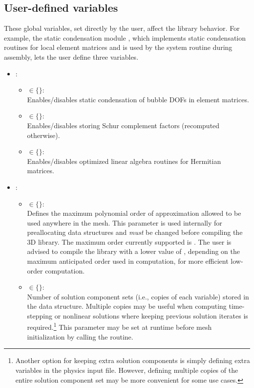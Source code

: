 \subsection{User-defined variables}

These global variables, set directly by the user, affect the library behavior. For example, the static condensation module , which implements static condensation routines for local element matrices and is used by the system routine  during assembly, lets the user define three variables.

\begin{itemize}
	\item
	{
		 :
		\begin{itemize}
			\item { $\in \{$$\}$: \\
				Enables/disables static condensation of bubble DOFs in element matrices.}
			\item { $\in \{$$\}$: \\
				Enables/disables storing Schur complement factors (recomputed otherwise).}
			\item { $\in \{$$\}$: \\
				Enables/disables optimized linear algebra routines for Hermitian matrices.}
		\end{itemize}
	}
	\item
	{
		 : 
		\begin{itemize}
			\item { $\in \{$$\}$:\\
			Defines the maximum polynomial order of approximation allowed to be used anywhere in the mesh. This parameter is used internally for preallocating data structures and \emph{must} be changed before compiling the \hp3D library. The maximum order currently supported is . The user is advised to compile the library with a lower value of , depending on the maximum anticipated order used in computation, for more efficient low-order computation.
			}
			\item { $\in \{$$\}$:\\
			Number of solution component sets (i.e., copies of each variable) stored in the data structure. Multiple copies may be useful when computing time-stepping or nonlinear solutions where keeping previous solution iterates is required.\footnote{Another option for keeping extra solution components is simply defining extra variables in the physics input file. However, defining multiple copies of the entire solution component set may be more convenient for some use cases.} This parameter may be set at runtime before mesh initialization by calling the  routine.
}
\end{itemize}}
\end{itemize}
